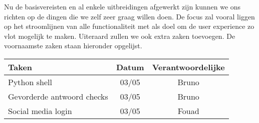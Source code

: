 Nu de basisvereisten en al enkele uitbreidingen afgewerkt zijn kunnen we ons richten op de dingen die we zelf zeer graag willen doen.
De focus zal vooral liggen op het stroomlijnen van alle functionaliteit met als doel om de user experience zo vlot mogelijk te maken.
Uiteraard zullen we ook extra zaken toevoegen. De voornaamste zaken staan hieronder opgelijst.
\begin{tabular}{| l | c | c |}
    \hline
    Taken               &   Datum   &   Verantwoordelijke \\
    \hline \hline
    Python shell        &   03/05   &   Bruno   \\
    Gevorderde antwoord checks &   03/05   &   Bruno   \\
    Social media login  &   03/05   &   Fouad   \\
    \hline
\end{tabular}
